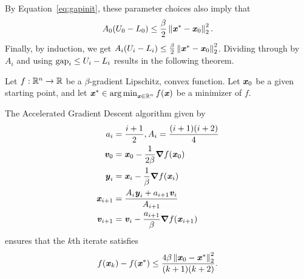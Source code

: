 By Equation~\eqref{eq:gapinit}, these parameter choices also imply
that
\[
  A_0 (U_0 - L_0) \leq \frac{\beta }{2}\norm{ \xx^* - \xx_0}_2^2  .
\]
Finally, by induction, we get
$ A_{i}( U_{i} - L_{i})  \leq  \frac{\beta }{2}\norm{ \xx^* -
  \xx_0}_2^2$.
Dividing through by $A_i$ and using $\gap_i \leq  U_{i} - L_{i}$
results in the following theorem.
\begin{theorem}
  Let $f : \R^n \to \R$ be a $\beta$-gradient Lipschitz, convex
  function.
  Let $\xx_0$ be a given starting point,
  and let $\xx^* \in \argmin_{\xx \in \R^n} f(\xx)$ be a minimizer of
  $f$.

The Accelerated Gradient Descent algorithm given by
\begin{align*}
  a_i &= \frac{i+1}{2}, A_i = \frac{(i+1)(i+2)}{4}     \\
 \vv_0 & = \xx_0 - \frac{1}{2\beta} \grad f(\xx_0) \\
  \yy_{i} &= \xx_{i} - \frac{1}{\beta} \grad f(\xx_{i}) \\
  \xx_{i+1} &=  \frac{
A_{i} \yy_{i} + a_{i+1} \vv_{i}
            }{A_{i+1}} \\
  \vv_{i+1} &= \vv_{i}  - \frac{a_{i+1}}{\beta} \grad f(\xx_{i+1})
\end{align*}
 ensures that the $k$th iterate satisfies
 \[
   f(\xx_{k}) - f(\xx^*)\leq \frac{4 \beta \norm{\xx_0 - \xx^*}_2^2}{(k+1)(k+2)}
   .
 \]
\end{theorem}





